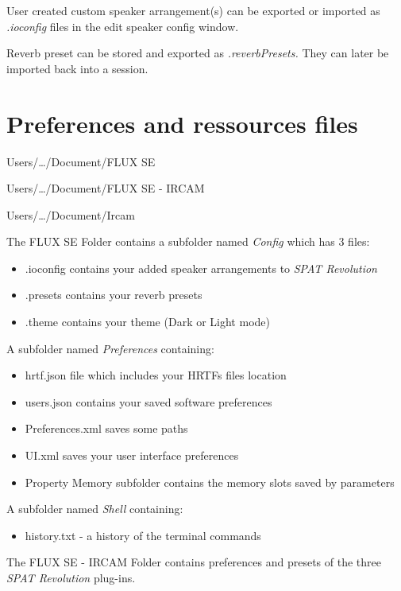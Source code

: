 \documentclass[
  letterpaper,
  DIV=11,
  numbers=noendperiod]{scrreport}
\providecommand{\tightlist}{%
  \setlength{\itemsep}{0pt}\setlength{\parskip}{0pt}}\usepackage{longtable,booktabs,array}
\begin{document}
User created custom speaker arrangement(s) can be exported or imported
as \emph{.ioconfig} files in the edit speaker config window.

Reverb preset can be stored and exported as \emph{.reverbPresets.} They
can later be imported back into a session.

\hypertarget{preferences-and-ressources-files}{%
\section{Preferences and ressources
files}\label{preferences-and-ressources-files}}

Users/\ldots/Document/FLUX SE

Users/\ldots/Document/FLUX SE - IRCAM

Users/\ldots/Document/Ircam

The FLUX SE Folder contains a subfolder named \emph{Config} which has 3
files:

\begin{itemize}
\tightlist
\item
  .ioconfig contains your added speaker arrangements to \emph{SPAT
  Revolution}
\item
  .presets contains your reverb presets
\item
  .theme contains your theme (Dark or Light mode)
\end{itemize}

A subfolder named \emph{Preferences} containing:

\begin{itemize}
\tightlist
\item
  hrtf.json file which includes your HRTFs files location
\item
  users.json contains your saved software preferences
\item
  Preferences.xml saves some paths
\item
  UI.xml saves your user interface preferences
\item
  Property Memory subfolder contains the memory slots saved by
  parameters
\end{itemize}

A subfolder named \emph{Shell} containing:

\begin{itemize}
\tightlist
\item
  history.txt - a history of the terminal commands
\end{itemize}

The FLUX SE - IRCAM Folder contains preferences and presets of the three
\emph{SPAT Revolution} plug-ins.
\end{document}
